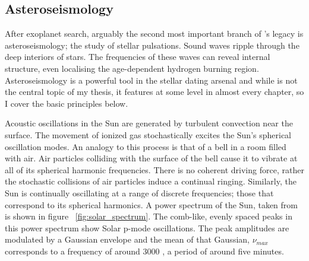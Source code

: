 
\subsection{Asteroseismology}

After exoplanet search, arguably the second most important branch of \kepler's
legacy is asteroseismology; the study of stellar pulsations.
Sound waves ripple through the deep interiors of stars.
The frequencies of these waves can reveal internal structure, even localising
the age-dependent hydrogen burning region.
Asteroseismology is a powerful tool in the stellar dating arsenal and while is
not the central topic of my thesis, it features at some level in almost every
chapter, so I cover the basic principles below.

Acoustic oscillations in the Sun are generated by turbulent convection near
the surface.
The movement of ionized gas stochastically excites the Sun's spherical
oscillation modes.
An analogy to this process is that of a bell in a room filled with air.
Air particles colliding with the surface of the bell cause it to vibrate at
all of its spherical harmonic frequencies.
There is no coherent driving force, rather the stochastic collisions of air
particles induce a continual ringing.
Similarly, the Sun is continually oscillating at a range of discrete
frequencies; those that correspond to its spherical harmonics.
A power spectrum of the Sun, taken from \citet{brown} is shown in figure
~\ref{fig:solar_spectrum}.
The comb-like, evenly spaced peaks in this power spectrum show Solar p-mode
oscillations.
The peak amplitudes are modulated by a Gaussian envelope and the mean of that
Gaussian, $\nu_{max}$ corresponds to a frequency of around 3000 \uHz, a period
of around five minutes.

